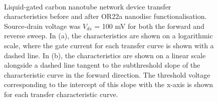\documentclass[
  a4paper,
]{scrbook}
\begin{document}
\begin{figure}
\begin{minipage}[t]{0.01\linewidth}
\end{minipage}%
%
\begin{minipage}[t]{0.45\linewidth}

{\centering 


}

\end{minipage}%
%
\begin{minipage}[t]{0.01\linewidth}

{\centering 

~

}

\end{minipage}%

\caption[Liquid-gated carbon nanotube network device transfer
characteristics before and after successful OR22a nanodisc
functionalisation.]{\label{fig-OR22a-TX-comparison}Liquid-gated carbon
nanotube network device transfer characteristics before and after OR22a
nanodisc functionalisation. Source-drain voltage was \(V_{ds}\) = 100 mV
for both the forward and reverse sweep. In (a), the characteristics are
shown on a logarithmic scale, where the gate current for each transfer
curve is shown with a dashed line. In (b), the characteristics are shown
on a linear scale alongside a dashed line tangent to the subthreshold
slope of the characteristic curve in the forward direction. The
threshold voltage corresponding to the intercept of this slope with the
x-axis is shown for each transfer characteristic curve.}

\end{figure}
\end{document}
